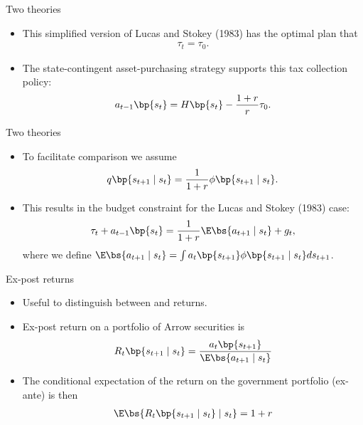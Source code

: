 \documentclass[11pt,xcolor={dvipsnames},aspectratio=159,hyperref={pdftex,pdfpagemode=UseNone,hidelinks,pdfdisplaydoctitle=true},usepdftitle=false]{beamer}
\begin{document}
\begin{frame}{Two theories}
    \begin{itemize}
        \item This simplified version of Lucas and Stokey (1983) has the optimal plan that 
    \begin{align*}
       \tau_t = \tau_0.
        \end{align*}
    \item The state-contingent asset-purchasing strategy supports this tax collection policy:
    \begin{align*}
        a_{t-1}\bp{s_t} = H\bp{s_t} - \frac{1+r}{r} \tau_0.
    \end{align*} 
\end{itemize}
\end{frame}


\begin{frame}{Two theories}
    \begin{itemize}
    \item To facilitate comparison we assume 
    \begin{align*}  
    q\bp{s_{t+1} \mid s_t } = \frac{1}{1+r} \phi\bp{s_{t+1} \mid s_t }.
    \end{align*}
    \item This results in the budget constraint for the Lucas and Stokey (1983) case: 
    \begin{align*}
        \tau_t + a_{t-1}\bp{s_t} = \frac{1}{1+r} \E \bs{a_{t+1} \mid s_t} + g_t, 
    \end{align*}
    where we define $\E \bs{a_{t+1} \mid s_t } = \int a_{t}\bp{s_{t+1}} \phi\bp{s_{t+1} \mid s_t } ds_{t+1}$.
    \end{itemize}
    \end{frame}
    
    
    \begin{frame}{Ex-post returns}
        \begin{itemize}
        \item Useful to distinguish between  and  returns.
        \item Ex-post return on a portfolio of Arrow securities is 
        \begin{align*}
            R_t \bp{s_{t+1}\mid s_t}=\frac{a_t\bp{s_{t+1}}}{\E \bs{a_{t+1} \mid s_t }}  
        \end{align*}
        \item The conditional expectation of the return on the government portfolio (ex-ante) is then
        \begin{align*}
            \E\bs{R_t \bp{s_{t+1}\mid s_t}\mid s_t} = 1+r
        \end{align*}    
    \end{itemize}
        \end{frame}
\end{document}
